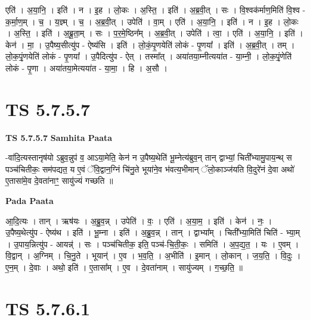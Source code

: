 \documentclass[17pt]{extarticle}
\begin{document}
एति॑ । अ॒या॒नि॒ । इति॑ । न । इ॒ह । लो॒कः । अ॒स्ति॒ । इति॑ । अ॒ब्र॒वी॒त् । सः । वि॒श्वक॑र्माण॒मिति॑ वि॒श्व - क॒र्मा॒ण॒म् । च॒ । य॒ज्ञ्म् । च॒ । अ॒ब्र॒वी॒त् । उपेति॑ । वा॒म् । एति॑ । अ॒या॒नि॒ । इति॑ । न । इ॒ह । लो॒कः । अ॒स्ति॒ । इति॑ । अ॒ब्रू॒ता॒म् । सः । प॒र॒मे॒ष्ठिन᳚म् । अ॒ब्र॒वी॒त् । उपेति॑ । त्वा॒ । एति॑ । अ॒या॒नि॒ । इति॑ । केन॑ । मा॒ । उ॒पैष्य॒सीत्यु॑प - ऐष्य॑सि । इति॑ । लो॒कं॒पृ॒णयेति॑ लोकं - पृ॒णया᳚ । इति॑ । अ॒ब्र॒वी॒त् । तम् । लो॒क॒पृं॒णयेति॑ लोकं - पृ॒णया᳚ । उ॒पैदित्यु॑प - ऐत् । तस्मा᳚त् । अया॑तया॒म्नीत्यया॑त - या॒म्नी॒ । लो॒क॒पृं॒णेति॑ लोकं - पृ॒णा । अया॑तया॒मेत्यया॑त - या॒मा॒ । हि । अ॒सौ ।  \newline





\section{ TS 5.7.5.7 }

\textbf{TS 5.7.5.7 } \newline
\textbf{Samhita Paata} \newline

-वा॑दि॒त्यस्तानृष॑यो ऽब्रुव॒न्नुप॑ व॒ आऽया॒मेति॒ केन॑ न उ॒पैष्य॒थेति॑ भू॒म्नेत्य॑ब्रुव॒न् तान् द्वाभ्यां॒ चिती᳚भ्यामु॒पाय॒न्थ् स पञ्च॑चितीकः॒ सम॑पद्यत॒ य ए॒वं ॅवि॒द्वान॒ग्निं चि॑नु॒ते भूया॑ने॒व भ॑वत्य॒भीमान् ॅलो॒काञ्ज॑यति वि॒दुरे॑नं दे॒वा अथो॑ ए॒तासा॑मे॒व दे॒वता॑नाꣳ॒॒ सायु॑ज्यं गच्छति ॥ \newline

\textbf{Pada Paata} \newline

आ॒दि॒त्यः । तान् । ऋष॑यः । अ॒ब्रु॒व॒न्न् । उपेति॑ । वः॒ । एति॑ । अ॒या॒म॒ । इति॑ । केन॑ । नः॒ । उ॒पैष्य॒थेत्यु॑प - ऐष्य॑थ । इति॑ । भू॒म्ना । इति॑ । अ॒ब्रु॒व॒न्न् । तान् । द्वाभ्या᳚म् । चिती᳚भ्या॒मिति॑ चिति॑ - भ्या॒म् । उ॒पाय॒न्नित्यु॑प - आयन्न्॑ । सः । पञ्च॑चितीक॒ इति॒ पञ्च॑-चि॒ती॒कः॒ । समिति॑ । अ॒प॒द्य॒त॒ । यः । ए॒वम् । वि॒द्वान् । अ॒ग्निम् । चि॒नु॒ते । भूयान्॑ । ए॒व । भ॒व॒ति॒ । अ॒भीति॑ । इ॒मान् । लो॒कान् । ज॒य॒ति॒ । वि॒दुः । ए॒न॒म् । दे॒वाः । अथो॒ इति॑ । ए॒तासा᳚म् । ए॒व । दे॒वता॑नाम् । सायु॑ज्यम् । ग॒च्छ॒ति॒ ॥  \newline





\section{ TS 5.7.6.1 }
\end{document}
